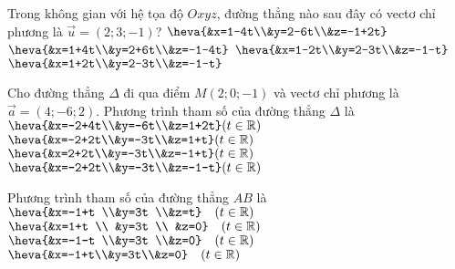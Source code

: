 %

\begin{ex}%
	Trong không gian với hệ tọa độ $Oxyz$, đường thẳng nào sau đây có vectơ chỉ phương là $\vec{u}=(2; 3;-1)$?
	\choice
	{\True $\heva{&x=1-4t\\&y=2-6t\\&z=-1+2t}$}
	{$\heva{&x=1+4t\\&y=2+6t\\&z=-1-4t}$}
	{$\heva{&x=1-2t\\&y=2-3t\\&z=-1-t}$}
	{$\heva{&x=1+2t\\&y=2-3t\\&z=-1-t}$}
\end{ex}

\begin{ex}%
	Cho đường thẳng $\Delta$ đi qua điểm $M(2;0;-1)$ và vectơ chỉ phương là $\overrightarrow{a}=(4;-6;2)$. Phương trình tham số của đường thẳng $\Delta$ là
	\choice
	{$\heva{&x=-2+4t\\&y=-6t\\&z=1+2t} (t\in\mathbb{R})$}
	{$\heva{&x=-2+2t\\&y=-3t\\&z=1+t} (t\in\mathbb{R})$}
	{\True $\heva{&x=2+2t\\&y=-3t\\&z=-1+t} (t\in\mathbb{R})$}
	{$\heva{&x=-2+2t\\&y=-3t\\&z=-1-t} (t\in\mathbb{R})$}
\end{ex}

\begin{ex}%
	Phương trình tham số của đường thẳng $AB$ là
	\choice
	{$\heva{&x=-1+t \\&y=3t \\&z=t} \quad(t \in \mathbb{R})$}
	{$\heva{&x=1+t \\ &y=3t \\ &z=0} \quad(t \in \mathbb{R})$}
	{$\heva{&x=-1-t \\&y=3t \\&z=0} \quad(t \in \mathbb{R})$}
	{\True $\heva{&x=-1+t\\&y=3t\\&z=0} \quad(t \in \mathbb{R})$}
\end{ex}

